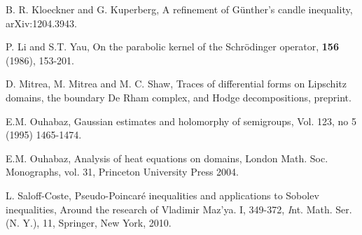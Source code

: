 \documentclass[10pt]{amsart}
\theoremstyle{definition}
\begin{document}
\begin{thebibliography}{99}
\newblock B. R. Kloeckner and G. Kuperberg,
\newblock A refinement of G\"unther's candle inequality, 
\newblock arXiv:1204.3943.

 \newblock P. Li and  S.T. Yau, 
 \newblock On the parabolic kernel of the Schr\"odinger operator, 
  \textbf{156} (1986), 153-201.
 
 \newblock  D. Mitrea, M. Mitrea and M. C.  Shaw,
 \newblock  Traces of differential forms on Lipschitz domains, the boundary De Rham complex, and Hodge decompositions, preprint.
  
   E.M. Ouhabaz, 
  \newblock Gaussian estimates and holomorphy of semigroups, 
    Vol. 123, no 5 (1995) 1465-1474.
  
 \newblock E.M. Ouhabaz,
 \newblock Analysis of heat equations on domains,  
 \newblock London Math. Soc. Monographs, vol. 31, Princeton University Press 2004.
 
 \newblock L. Saloff-Coste,
 \newblock Pseudo-Poincar\'e inequalities and applications to Sobolev inequalities,
 \newblock  Around the research of Vladimir Maz'ya. I, 349-372, {\emph Int. Math. Ser. (N. Y.)}, 11, Springer, New York, 2010. 

\end{thebibliography}

\bigskip
\end{document}
